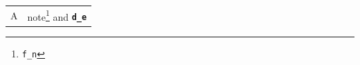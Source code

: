 \documentclass{article}
\begin{document}
\begin{tabularx}{\linewidth}{lX}
A & note\footnote{\verb|f_n|} and \textbf{\verb+d_e+} \\
\end{tabularx}
\end{document}
